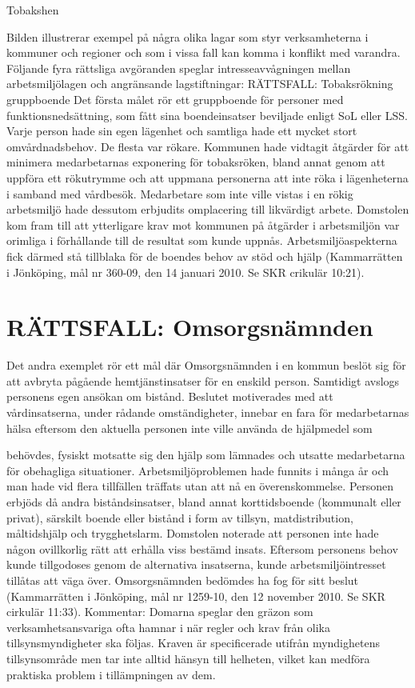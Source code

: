 Tobakshen

Bilden illustrerar exempel på några olika lagar som styr verksamheterna i kommuner och regioner och som i vissa fall kan komma i konflikt med varandra.
Följande fyra rättsliga avgöranden speglar intresseavvågningen mellan arbetsmiljölagen och angränsande lagstiftningar:
RÄTTSFALL: Tobaksrökning gruppboende
Det första målet rör ett gruppboende för personer med funktionsnedsättning, som fått sina boendeinsatser beviljade enligt SoL eller LSS. Varje person hade sin egen lägenhet och samtliga hade ett mycket stort omvårdnadsbehov. De flesta var rökare. Kommunen hade vidtagit åtgärder för att minimera medarbetarnas exponering för tobaksröken, bland annat genom att uppföra ett rökutrymme och att uppmana personerna att inte röka i lägenheterna i samband med vårdbesök. Medarbetare som inte ville vistas i en rökig arbetsmiljö hade dessutom erbjudits omplacering till likvärdigt arbete. Domstolen kom fram till att ytterligare krav mot kommunen på åtgärder i arbetsmiljön var orimliga i förhållande till de resultat som kunde uppnås. Arbetsmiljöaspekterna fick därmed stå tillblaka för de boendes behov av stöd och hjälp (Kammarrätten i Jönköping, mål nr 360-09, den 14 januari 2010. Se SKR crikulär 10:21).
\section*{RÄTTSFALL: Omsorgsnämnden}
Det andra exemplet rör ett mål där Omsorgsnämnden i en kommun beslöt sig för att avbryta pågående hemtjänstinsatser för en enskild person. Samtidigt avslogs personens egen ansökan om bistånd. Beslutet motiverades med att vårdinsatserna, under rådande omständigheter, innebar en fara för medarbetarnas hälsa eftersom den aktuella personen inte ville använda de hjälpmedel som

behövdes, fysiskt motsatte sig den hjälp som lämnades och utsatte medarbetarna för obehagliga situationer. Arbetsmiljöproblemen hade funnits i många år och man hade vid flera tillfällen träffats utan att nå en överenskommelse. Personen erbjöds då andra biståndsinsatser, bland annat korttidsboende (kommunalt eller privat), särskilt boende eller bistånd i form av tillsyn, matdistribution, måltidshjälp och trygghetslarm. Domstolen noterade att personen inte hade någon ovillkorlig rätt att erhålla viss bestämd insats. Eftersom personens behov kunde tillgodoses genom de alternativa insatserna, kunde arbetsmiljöintresset tillåtas att väga över. Omsorgsnämnden bedömdes ha fog för sitt beslut (Kammarrätten i Jönköping, mål nr 1259-10, den 12 november 2010. Se SKR cirkulär 11:33).
Kommentar: Domarna speglar den gräzon som verksamhetsansvariga ofta hamnar i när regler och krav från olika tillsynsmyndigheter ska följas. Kraven är specificerade utifrån myndighetens tillsynsområde men tar inte alltid hänsyn till helheten, vilket kan medföra praktiska problem i tillämpningen av dem.
